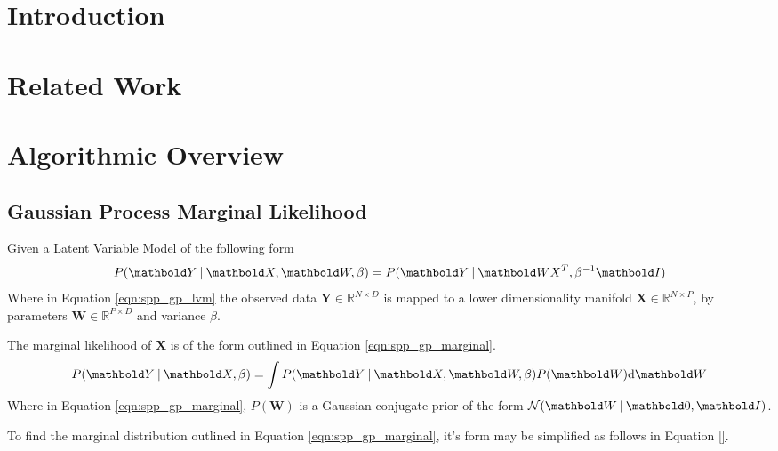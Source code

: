 \section{Introduction}
\label{sec:spp_introduction}
% 

\section{Related Work}
\label{sec:spp_related}

\section{Algorithmic Overview}
\label{sec:spp_algorithm}
\subsection{Gaussian Process Marginal Likelihood}
\label{subsec:spp_gp_marginal_likelihood}
Given a Latent Variable Model of the following form
\begin{equation}
  \label{eqn:spp_gp_lvm}
  P(\bm{Y} \given \bm{X}, \bm{W}, \beta) = P(\bm{Y} \given \bm{WX}^{T}, \beta^{-1}\bm{I})
\end{equation}
Where in Equation \ref{eqn:spp_gp_lvm} the observed data $\bm{Y} \in \mathbb{R}^{N \times D}$ 
is mapped to a lower dimensionality manifold $\bm{X} \in \mathbb{R}^{N \times P}$, by parameters 
$\bm{W} \in \mathbb{R}^{P \times D}$ and variance $\beta$.

The marginal likelihood of $\bm{X}$ is of the form outlined in Equation \ref{eqn:spp_gp_marginal}.
\begin{equation}
  \label{eqn:spp_gp_marginal}
  P(\bm{Y} \given \bm{X}, \beta) = \int P(\bm{Y} \given \bm{X}, \bm{W}, \beta) P(\bm{W}) \intd{\bm{W}}
\end{equation}
Where in Equation \ref{eqn:spp_gp_marginal}, $P(\bm{W})$ is a Gaussian conjugate prior of the 
form $\mathcal{N}(\bm{W} \given \bm{0}, \bm{I})$.

To find the marginal distribution outlined in Equation \ref{eqn:spp_gp_marginal}, it's form may 
be simplified as follows in Equation \ref{}.

